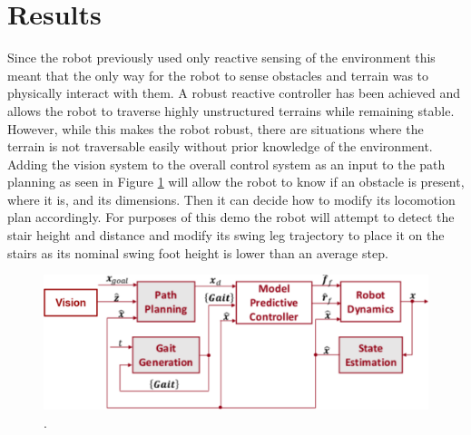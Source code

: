 
\section{Results}


Since the robot previously used only reactive sensing of the environment this meant that the only way for the robot to sense obstacles and terrain was to physically interact with them. A robust reactive controller has been achieved and allows the robot to traverse highly unstructured terrains while remaining stable. However, while this makes the robot robust, there are situations where the terrain is not traversable easily without prior knowledge of the environment. Adding the vision system to the overall control system as an input to the path planning as seen in Figure \ref{fig:BD} will allow the robot to know if an obstacle is present, where it is, and its dimensions. Then it can decide how to modify its locomotion plan accordingly. For purposes of this demo the robot will attempt to detect the stair height and distance and modify its swing leg trajectory to place it on the stairs as its nominal swing foot height is lower than an average step.
\begin{figure}[!h]
\centering
\includegraphics[width=\columnwidth]{Figures/BlockDiagram.pdf}
\caption{.}
\label{fig:BD}
\end{figure}


